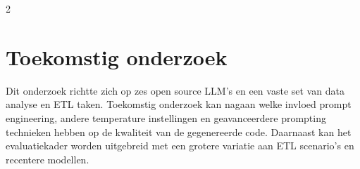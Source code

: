 \documentclass[a0,portrait]{hogent-poster}
\begin{document}
\begin{multicols}{2}
      
        
        
        \section{Toekomstig onderzoek}
        
        Dit onderzoek richtte zich op zes open source LLM's en een vaste set van
        data analyse en ETL taken. Toekomstig onderzoek kan nagaan welke invloed
        prompt engineering, andere temperature instellingen en geavanceerdere
        prompting technieken hebben op de kwaliteit van de gegenereerde code.
        Daarnaast kan het evaluatiekader worden uitgebreid met een grotere
        variatie aan ETL scenario's en recentere modellen.
        
    \end{multicols}
    
\end{document}
